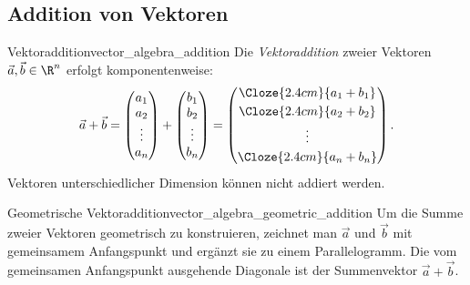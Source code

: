\subsection{Addition von Vektoren}
\label{subsec:vector_algebra_addition}

\begin{DefinitionBox}{Vektoraddition}{vector_algebra_addition}
  Die \emph{Vektoraddition}  zweier Vektoren
  $\vec a,\vec b\in\R^n$ erfolgt komponentenweise:
  \[
    \vec a+\vec b
    =\begin{pmatrix}a_1\\a_2\\\vdots\\a_n\end{pmatrix}
     +\begin{pmatrix}b_1\\b_2\\\vdots\\b_n\end{pmatrix}
    =\begin{pmatrix}
      \Cloze{2.4cm}{a_1+b_1}\\[0.25em]
      \Cloze{2.4cm}{a_2+b_2}\\[0.25em]
      \vdots\\[0.25em]
      \Cloze{2.4cm}{a_n+b_n}
    \end{pmatrix}.
  \]
  Vektoren unterschiedlicher Dimension können nicht addiert werden.
\end{DefinitionBox}

\begin{KeyPointBox}{Geometrische Vektoraddition}{vector_algebra_geometric_addition}
  Um die Summe zweier Vektoren geometrisch zu konstruieren, zeichnet man
  $\vec a$ und $\vec b$ mit gemeinsamem Anfangspunkt und ergänzt sie zu einem
  Parallelogramm. Die vom gemeinsamen Anfangspunkt ausgehende Diagonale ist der
  Summenvektor $\vec a+\vec b$.
  \begin{center}
  \end{center}
\end{KeyPointBox}

